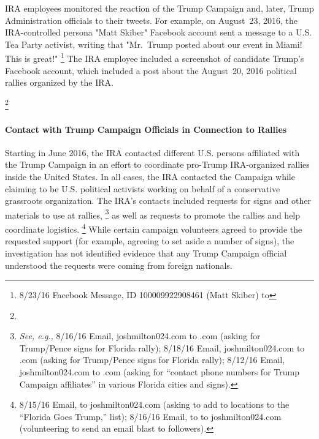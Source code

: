 IRA employees monitored the reaction of the Trump Campaign and, later, Trump Administration officials to their tweets.
For example, on August~23, 2016, the IRA-controlled persona "Matt Skiber" Facebook account sent a message to a U.S. Tea Party activist, writing that "Mr.~Trump posted about our event in Miami! This is great!"%
\footnote{8/23/16 Facebook Message, ID 100009922908461 (Matt Skiber) to }
The IRA employee included a screenshot of candidate Trump's Facebook account, which included a post about the August~20, 2016 political rallies organized by the IRA\null.

\footnote{}

\paragraph{Contact with Trump Campaign Officials in Connection to Rallies}

Starting in June 2016, the IRA contacted different U.S. persons affiliated with the Trump Campaign in an effort to coordinate pro-Trump IRA-organized rallies inside the United States.
In all cases, the IRA contacted the Campaign while claiming to be U.S. political activists working on behalf of a conservative grassroots organization.
The IRA's contacts included requests for signs and other materials to use at rallies,%
\footnote{\textit{See, e.g.,} 8/16/16 Email, joshmilton024\@gmail.com to \@donaldtrump.com (asking for Trump/Pence signs for Florida rally);
8/18/16 Email, joshmilton024\@gmail.com to \@donaldtrump.com (asking for Trump/Pence signs for Florida rally);
8/12/16 Email, joshmilton024\@gmail.com to \@donaldtrump.com (asking for “contact phone numbers for Trump Campaign affiliates” in various Florida cities and signs).
}
as well as requests to promote the rallies and help coordinate logistics.%
\footnote{8/15/16 Email,  to joshmilton024\@gmail.com (asking to add to locations to the “Florida Goes Trump,” list);
8/16/16 Email, to  to joshmilton024\@gmail.com (volunteering to send an email blast to followers).}
While certain campaign volunteers agreed to provide the requested support (for example, agreeing to set aside a number of signs), the investigation has not identified evidence that any Trump Campaign official understood the requests were coming from foreign nationals.

